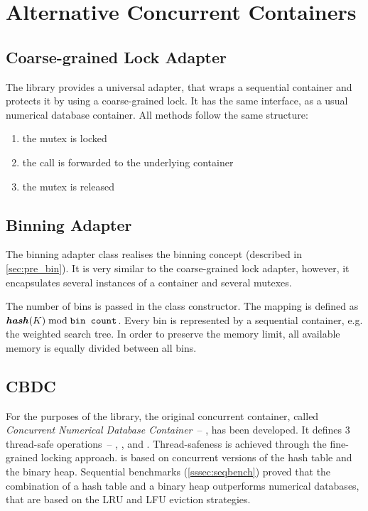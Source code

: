 \section{Alternative Concurrent Containers}

\subsection{Coarse-grained Lock Adapter}
The \numdbname library provides a universal adapter, that wraps a sequential container and protects it by using a coarse-grained lock. It has the same interface, as a usual numerical database container. All methods follow the same structure:
\begin{enumerate}
\item the mutex is locked
\item the call is forwarded to the underlying container
\item the mutex is released
\end{enumerate}

\subsection{Binning Adapter}
The binning adapter class realises the binning concept (described in \cref{sec:pre_bin}). It is very similar to the coarse-grained lock adapter, however, it encapsulates several instances of a container and several mutexes.

The number of bins is passed in the class constructor. The mapping is defined as  $\textbf{\textit{hash}}(K)\bmod \texttt{bin count}$. Every bin is represented by a sequential container, e.g. the weighted search tree. In order to preserve the memory limit, all available memory is equally divided between all bins.

\subsection{CBDC}
For the purposes of the \numdbname library, the original concurrent container, called \emph{Concurrent Numerical Database Container}~-- \cndcname, has been developed. It defines 3 thread-safe operations~-- \findop, \insertop, and . Thread-safeness is achieved through the fine-grained locking approach. \cndcname is based on concurrent versions of the hash table and the binary heap. Sequential benchmarks (\cref{sssec:seqbench}) proved that the combination of a hash table and a binary heap outperforms numerical databases, that are based on the LRU and LFU eviction strategies.

